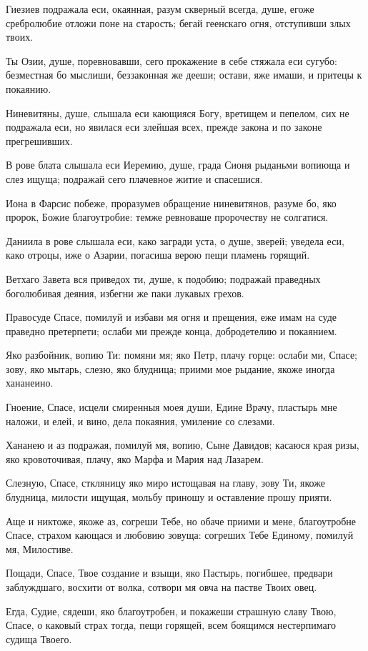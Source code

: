 Гиезиев подражала еси, окаянная, разум скверный всегда, душе, егоже сребролюбие отложи поне на старость; бегай геенскаго огня, отступивши злых твоих.


Ты Озии, душе, поревновавши, сего прокажение в себе стяжала еси сугубо: безместная бо мыслиши, беззаконная же дееши; остави, яже имаши, и притецы к покаянию.


Ниневитяны, душе, слышала еси кающияся Богу, вретищем и пепелом, сих не подражала еси, но явилася еси злейшая всех, прежде закона и по законе прегрешивших.


В рове блата слышала еси Иеремию, душе, града Сионя рыданьми вопиюща и слез ищуща; подражай сего плачевное житие и спасешися.


Иона в Фарсис побеже, проразумев обращение ниневитянов, разуме бо, яко пророк, Божие благоутробие: темже ревноваше пророчеству не солгатися.


Даниила в рове слышала еси, како загради уста, о душе, зверей; уведела еси, како отроцы, иже о Азарии, погасиша верою пещи пламень горящий.


Ветхаго Завета вся приведох ти, душе, к подобию; подражай праведных боголюбивая деяния, избегни же паки лукавых грехов.


Правосуде Спасе, помилуй и избави мя огня и прещения, еже имам на суде праведно претерпети; ослаби ми прежде конца, добродетелию и покаянием.


Яко разбойник, вопию Ти: помяни мя; яко Петр, плачу горце: ослаби ми, Спасе; зову, яко мытарь, слезю, яко блудница; приими мое рыдание, якоже иногда хананеино.


Гноение, Спасе, исцели смиренныя моея души, Едине Врачу, пластырь мне наложи, и елей, и вино, дела покаяния, умиление со слезами.


Хананею и аз подражая, помилуй мя, вопию, Сыне Давидов; касаюся края ризы, яко кровоточивая, плачу, яко Марфа и Мария над Лазарем.


Слезную, Спасе, сткляницу яко миро истощавая на главу, зову Ти, якоже блудница, милости ищущая, мольбу приношу и оставление прошу прияти.


Аще и никтоже, якоже аз, согреши Тебе, но обаче приими и мене, благоутробне Спасе, страхом кающася и любовию зовуща: согреших Тебе Единому, помилуй мя, Милостиве.


Пощади, Спасе, Твое создание и взыщи, яко Пастырь, погибшее, предвари заблуждшаго, восхити от волка, сотвори мя овча на пастве Твоих овец.

Егда, Судие, сядеши, яко благоутробен, и покажеши страшную славу Твою, Спасе, о каковый страх тогда, пещи горящей, всем боящимся нестерпимаго судища Твоего.


